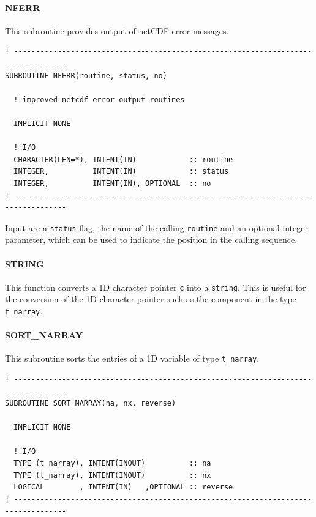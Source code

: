 \documentclass[11pt,twoside]{article}
\begin{document}
\paragraph{NFERR\\ \label{NFERR}}

This subroutine provides output of netCDF error messages.
\begin{verbatim}
! ----------------------------------------------------------------------------------
SUBROUTINE NFERR(routine, status, no)

  ! improved netcdf error output routines

  IMPLICIT NONE

  ! I/O
  CHARACTER(LEN=*), INTENT(IN)            :: routine
  INTEGER,          INTENT(IN)            :: status
  INTEGER,          INTENT(IN), OPTIONAL  :: no
! ----------------------------------------------------------------------------------
\end{verbatim}
Input are a \verb|status| flag, the name of the calling \verb|routine|
and an optional integer parameter, which can be used to indicate the
position in the calling sequence.

\paragraph{STRING\\ \label{STR}}
This function converts a 1D character pointer \verb|c| into a \verb|string|.
This is useful for the conversion of the 1D character pointer such as
the component in the type \verb|t_narray|.
\paragraph{SORT\_NARRAY\\ \label{SORT}}
This subroutine sorts the entries of a 1D variable of type \verb|t_narray|.

\begin{verbatim}
! ----------------------------------------------------------------------------------
SUBROUTINE SORT_NARRAY(na, nx, reverse)

  IMPLICIT NONE

  ! I/O
  TYPE (t_narray), INTENT(INOUT)          :: na
  TYPE (t_narray), INTENT(INOUT)          :: nx
  LOGICAL        , INTENT(IN)   ,OPTIONAL :: reverse
! ----------------------------------------------------------------------------------
\end{verbatim}
\end{document}
